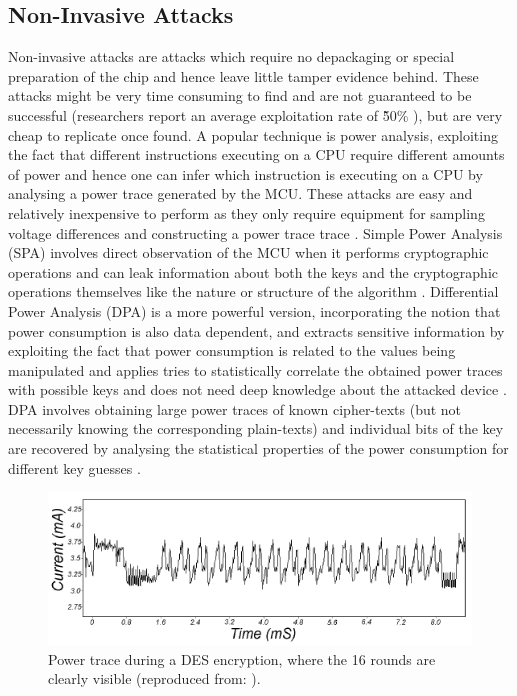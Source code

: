 \subsection{Non-Invasive Attacks}
Non-invasive attacks are attacks which require no depackaging or special preparation of the chip and hence leave little tamper evidence behind. These attacks might be very time consuming to find and are not guaranteed to be successful (researchers report an average exploitation rate of \~50\% \citep{sergei:thesis} \citep{glitches_paper}), but are very cheap to replicate once found.
A popular technique is power analysis, exploiting the fact that different instructions executing on a CPU require different amounts of power \citep{website:riscure} \citep{kocher:DPA} and hence one can infer which instruction is executing on a CPU by analysing a power trace generated by the MCU. These attacks are easy and relatively inexpensive to perform as they only require equipment for sampling voltage differences and constructing a power trace trace \citep{kocher:DPA}. Simple Power Analysis (SPA) involves direct observation of the MCU when it performs cryptographic operations and can leak information about both the keys and the cryptographic operations themselves like the nature or structure of the algorithm \citep{kocher:DPA} \citep{anderson:tamper_resistance}. Differential Power Analysis (DPA) is a more powerful version, incorporating the notion that power consumption is also data dependent, and extracts sensitive information by exploiting the fact that power consumption is related to the values being manipulated and applies tries to statistically correlate the obtained power traces with possible keys and does not need deep knowledge about the attacked device \citep{book:power_analysis}. DPA involves obtaining large power traces of known cipher-texts (but not necessarily knowing the corresponding plain-texts) and individual bits of the key are recovered by analysing the statistical properties of the power consumption for different key guesses \citep{kocher:DPA} \citep{anderson:tamper_resistance}.

\begin{figure}
\center
\includegraphics[scale=0.6]{img/power_des.png}
\caption{\footnotesize Power trace during a DES encryption, where the 16 rounds are clearly visible (reproduced from: \protect\citep{kocher:DPA}).}
\label{fig:des_power} 
\end{figure}

